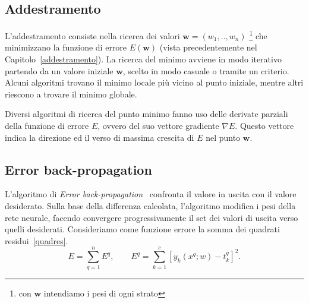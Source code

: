 \documentclass[11pt,a4paper,twoside,
openright]{book}
\begin{document}
\subsection{Addestramento}
L'addestramento consiste nella ricerca dei valori $\textbf{w}=(w_1,..,w_n)$ \footnote{con $\textbf{w}$ intendiamo i pesi di ogni strato} che minimizzano la funzione di errore $E(\textbf{w})$ (vista precedentemente nel Capitolo~\ref{addestramento}).
La ricerca del minimo avviene in modo iterativo partendo da un valore iniziale $\textbf{w}$, scelto in modo casuale o tramite un criterio. Alcuni algoritmi trovano il minimo locale più vicino al punto iniziale, mentre altri riescono a trovare il minimo globale.

Diversi algoritmi di ricerca del punto minimo fanno uso delle derivate parziali della funzione di errore $E$, ovvero del suo vettore gradiente $\nabla E$. Questo vettore indica la direzione ed il verso di massima crescita di $E$ nel punto $\textbf{w}$.
\subsection*{Error back-propagation}
L'algoritmo di \textit{Error back-propagation}~\cite{Rumelhart20081B} confronta il valore in uscita con il valore desiderato. Sulla base della differenza calcolata, l'algoritmo modifica i pesi della rete neurale, facendo convergere progressivamente il set dei valori di uscita verso quelli desiderati.
Consideriamo come funzione errore la somma dei quadrati residui~\eqref{quadres}.
\begin{equation}
E = \sum\limits_{q=1}^n E^{q}, \qquad
E^q = \sum\limits_{k=1}^c [y_k (x^q;w) - t_{k}^{q}]^2.
\label{resq}
\end{equation}
\end{document}

